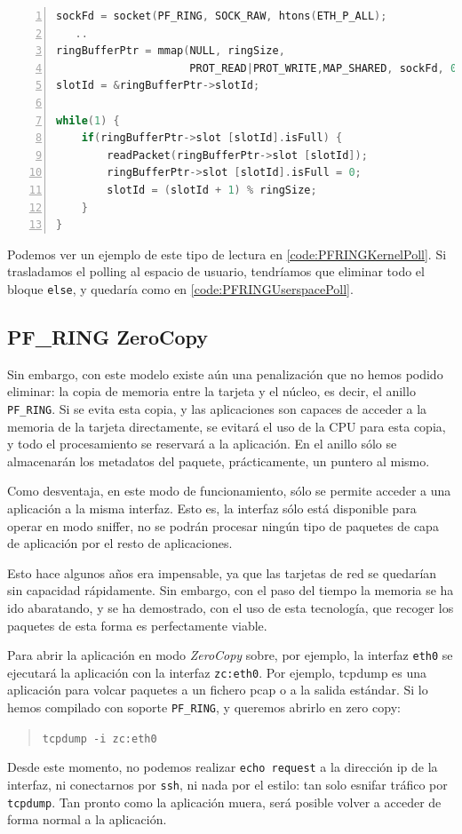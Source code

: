 \begin{lstlisting}[language=C++,caption={Lectura de paquetes con poll en el espacio de usuario}, 
breaklines=true, label=code:PFRINGUserspacePoll,numbers=left,float=htbp]
sockFd = socket(PF_RING, SOCK_RAW, htons(ETH_P_ALL);
   ..
ringBufferPtr = mmap(NULL, ringSize,
                     PROT_READ|PROT_WRITE,MAP_SHARED, sockFd, 0);
slotId = &ringBufferPtr->slotId;

while(1) {
    if(ringBufferPtr->slot [slotId].isFull) {
        readPacket(ringBufferPtr->slot [slotId]);
        ringBufferPtr->slot [slotId].isFull = 0;
        slotId = (slotId + 1) % ringSize;
    }
}
\end{lstlisting}

Podemos ver un ejemplo de este tipo de lectura en \lstlistingname{} \ref{code:PFRINGKernelPoll}. Si trasladamos el 
polling al espacio de usuario, tendríamos que eliminar todo el bloque \texttt{else}, y quedaría como en 
\lstlistingname{} \ref{code:PFRINGUserspacePoll}.

\subsection{PF\_RING ZeroCopy}
Sin embargo, con este modelo existe aún una penalización que no hemos podido eliminar: la copia de memoria entre la 
tarjeta y el núcleo, es decir, el anillo \texttt{PF\_RING}. Si se evita esta copia, y las aplicaciones son capaces de 
acceder a la memoria de la tarjeta directamente, se evitará el uso de la CPU para esta copia, y todo el procesamiento 
se reservará a la aplicación. En el anillo sólo se almacenarán los metadatos del paquete, prácticamente, un puntero al 
mismo.

Como desventaja, en este modo de funcionamiento, sólo se permite acceder a una aplicación a la misma interfaz. Esto es, 
la interfaz sólo está disponible para operar en modo sniffer, no se podrán procesar ningún tipo de paquetes de capa de 
aplicación por el resto de aplicaciones.

Esto hace algunos años era impensable, ya que las tarjetas de red se quedarían sin capacidad rápidamente. Sin embargo, 
con el paso del tiempo la memoria se ha ido abaratando, y se ha demostrado, con el uso de esta tecnología, que recoger 
los paquetes de esta forma es perfectamente viable.

Para abrir la aplicación en modo \emph{ZeroCopy} sobre, por ejemplo, la interfaz \texttt{eth0} se ejecutará la 
aplicación con la interfaz \texttt{zc:eth0}. Por ejemplo, tcpdump es una aplicación para volcar paquetes a un fichero 
pcap o a la salida estándar. Si lo hemos compilado con soporte \texttt{PF\_RING}, y queremos abrirlo en zero copy:
\begin{quote}
 \texttt{tcpdump -i zc:eth0}
\end{quote}
Desde este momento, no podemos realizar \texttt{echo request} a la dirección ip de la interfaz, ni conectarnos por 
\texttt{\gls{ssh}}, ni nada por el estilo: tan solo esnifar tráfico por \texttt{tcpdump}. Tan pronto como la aplicación 
muera, será posible volver a acceder de forma normal a la aplicación.

